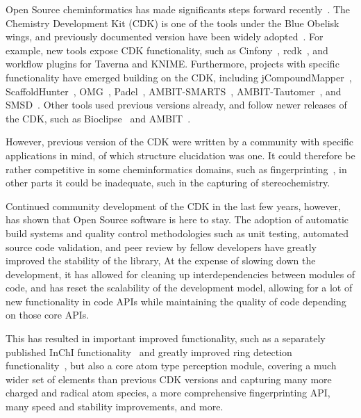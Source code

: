 \documentclass[10pt]{bmc_article}
\newenvironment{bmcformat}{\begin{raggedright}\baselineskip20pt\sloppy\setboolean{publ}{false}}{\end{raggedright}\baselineskip20pt\sloppy}
\begin{document}
\begin{bmcformat}
Open Source cheminformatics has made significants steps forward recently~\cite{OBoyle2011}.
The Chemistry Development Kit (CDK) is one of the tools under the Blue Obelisk wings,
and previously documented version have been widely adopted~\cite{Steinbeck2003,Steinbeck2006}.
For example, new tools expose CDK functionality, such as Cinfony~\cite{OBoyle2008},
rcdk~\cite{}, and workflow plugins for Taverna\cite{Truszkowski2011} and KNIME\cite{Beisken2013}.
Furthermore, projects with specific functionality have emerged building on the CDK, including
jCompoundMapper~\cite{Hinselmann2011}, ScaffoldHunter~\cite{wetzel2009interactive}, OMG~\cite{Peironcely2012},
Padel~\cite{yap2011padel}, AMBIT-SMARTS~\cite{jeliazkova2011ambitsmarts}, AMBIT-Tautomer~\cite{kochev2013ambit},
and SMSD~\cite{}. Other tools used previous versions already, and follow
newer releases of the CDK, such as Bioclipse~\cite{spjuth2007bioclipse,
spjuth2009bioclipse} and AMBIT~\cite{jeliazkova2011ambit}.

However, previous version of the CDK were written by a community with specific applications
in mind, of which structure elucidation was one. It could therefore be rather competitive
in some cheminformatics domains, such as fingerprinting~\cite{Ekins,Cannon}, in other parts
it could be inadequate, such in the capturing of stereochemistry.

Continued community development of the CDK in the last few years, however, has shown that
Open Source software is here to stay. The adoption of automatic build systems and
quality control methodologies such as unit testing, automated source code validation,
and peer review by fellow developers have greatly improved the stability of the library,
At the expense of slowing down the development, it has allowed for cleaning up interdependencies
between modules of code, and has reset the scalability of the development model,
allowing for a lot of new functionality in code APIs while maintaining the quality
of code depending on those core APIs.

This has resulted in important improved functionality, such as a separately published
InChI functionality~\cite{SpjuthXXXX} and greatly improved ring detection functionality~\cite{MayYYYY},
but also a core atom type perception module, covering a much wider set of elements than
previous CDK versions and capturing many more charged and radical atom species,
a more comprehensive fingerprinting API, many speed and stability improvements, and more.


\end{bmcformat}
\end{document}
